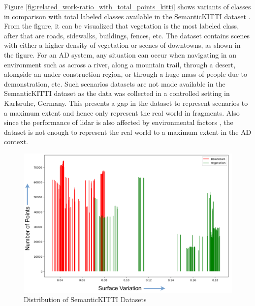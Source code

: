Figure \ref{fig:related_work-ratio_with_total_points_kitti} shows variants of classes in comparison with total labeled classes available in the SemanticKITTI dataset \parencite{behley2019semantickitti, sem_kitti_total_points_ratio}. From the figure, it can be visualized that vegetation is the most labeled class, after that are roads, sidewalks, buildings, fences, etc. The dataset contains scenes with either a higher density of vegetation or scenes of downtowns, as shown in the figure. For an AD system, any situation can occur when navigating in an environment such as across a river, along a mountain trail, through a desert, alongside an under-construction region, or through a huge mass of people due to demonstration, etc. Such scenarios datasets are not made available in the SemanticKITTI dataset as the data was collected in a controlled setting in Karlsruhe, Germany. This presents a gap in the dataset to represent scenarios to a maximum extent and hence only represent the real world in fragments. Also since the performance of lidar is also affected by environmental factors \parencite{park2023automotive}, the dataset is not enough to represent the real world to a maximum extent in the AD context.

\begin{figure}[htb]
    \centering
    \includegraphics[width=1\linewidth]{97_graphics/related_work/downtown_and_vegetation_sv.pdf}
    \caption{Distribution of SemanticKITTI Datasets}
    \label{fig:related_work-downtown_and_vegetation_sv}
\end{figure}

